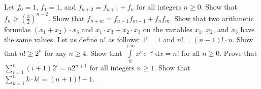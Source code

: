 \begin{chapterendexercises}
    \exercise Let $f_0 = 1$, $f_1 = 1$, and $f_{n + 2} = f_{n + 1} + f_n$ for
        all integers $n \ge 0$. Show that
        $f_n \ge \left(\frac{3}{2}\right)^{n - 2}$.
    \exercise Show that $f_{n + m} = f_{n - 1} f_{m - 1} + f_n f_m$.
    \exercise Show that two arithmetic formulas $(x_1 + x_2) \cdot x_3$ and
        $x_1 \cdot x_3 + x_2 \cdot x_3$ on the variables $x_1$, $x_2$, and $x_3$
        have the same values.
    \exercise Let us define $n!$ as follows: $1! = 1$ and
        $n! = (n - 1)! \cdot n$. Show that $n! \ge 2^n$ for any $n \ge 4$.
    \exercise Show that
        $\int\limits_0^{+\infty} x^n e^{- x} ~ \mathrm{d}x = n!$
        for all $n \ge 0$.
    \exercise Prove that $\sum_{i = 1}^n (i + 1) 2^i = n 2^{n + 1}$
        for all integers $n \ge 1$.
    \exercise Show that $\sum_{k = 1}^n k \cdot k! = (n + 1)! - 1$.
\end{chapterendexercises}
